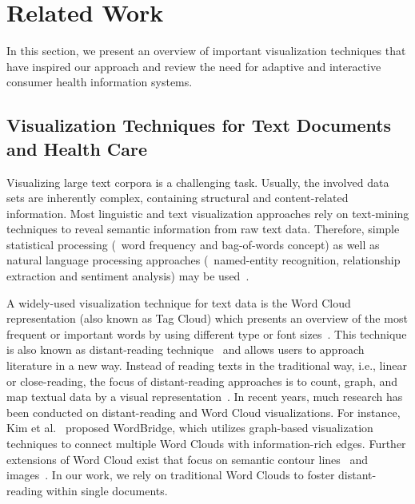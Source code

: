 \section{Related Work}
\label{sec:related-work}

In this section, we present an overview of important visualization techniques that have inspired our approach and review the need for adaptive and interactive consumer health information systems.

\subsection{Visualization Techniques for Text Documents and Health Care}
Visualizing large text corpora is a challenging task. 
%
Usually, the involved data sets are inherently complex, containing structural and content-related information. 
%
Most linguistic and text visualization approaches rely on text-mining techniques to reveal semantic information from raw text data. 
%
Therefore, simple statistical processing (\eg\ word frequency and bag-of-words concept) as well as natural language processing approaches (\eg\ named-entity recognition, relationship extraction and sentiment analysis) may be used~\cite{10.1002/widm.1071, 7156366}.


A widely-used visualization technique for text data is the Word Cloud representation (also known as Tag Cloud) which presents an overview of the most frequent or important words by using different type or font sizes~\cite{6758829}.
%
This technique is also known as distant-reading technique~\cite{moretti2005graphs} and allows users to approach literature in a new way.
%
Instead of reading texts in the traditional way, i.e., linear or close-reading, the focus of distant-reading approaches is to count, graph, and map textual data by a visual representation~\cite{janicke2015close}.
%
In recent years, much research has been conducted on distant-reading and Word Cloud visualizations. 
%
For instance, Kim et al.~\cite{5718617} proposed WordBridge, which utilizes graph-based visualization techniques to connect multiple Word Clouds with information-rich edges. 
%
Further extensions of Word Cloud exist that focus on semantic contour lines~\cite{2011.01923.x} and images~\cite{doi:10.1177}. 
%
In our work, we rely on traditional Word Clouds to foster distant-reading within single documents.


